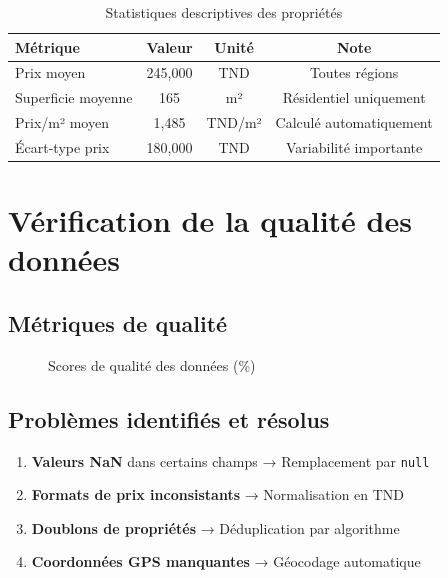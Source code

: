 \documentclass[12pt,a4paper]{report}
\begin{document}
\begin{table}[H]
    \centering
    \caption{Statistiques descriptives des propriétés}
    \begin{tabular}{|l|c|c|c|}
        \hline
        \textbf{Métrique} & \textbf{Valeur} & \textbf{Unité} & \textbf{Note} \\
        \hline
        Prix moyen & 245,000 & TND & Toutes régions \\
        \hline
        Superficie moyenne & 165 & m² & Résidentiel uniquement \\
        \hline
        Prix/m² moyen & 1,485 & TND/m² & Calculé automatiquement \\
        \hline
        Écart-type prix & 180,000 & TND & Variabilité importante \\
        \hline
    \end{tabular}
\end{table}

\section{Vérification de la qualité des données}

\subsection{Métriques de qualité}

\begin{figure}[H]
    \centering
    \caption{Scores de qualité des données (\%)}
\end{figure}

\subsection{Problèmes identifiés et résolus}

\begin{enumerate}
    \item \textbf{Valeurs NaN} dans certains champs → Remplacement par \texttt{null}
    \item \textbf{Formats de prix inconsistants} → Normalisation en TND
    \item \textbf{Doublons de propriétés} → Déduplication par algorithme
    \item \textbf{Coordonnées GPS manquantes} → Géocodage automatique
\end{enumerate}
\end{document}
